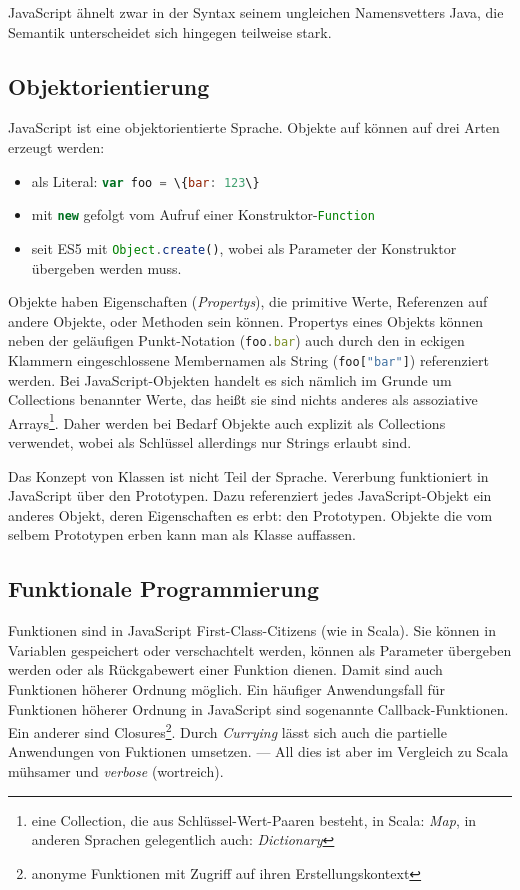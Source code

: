 \documentclass[a4paper, 12pt, hidelinks, listof=totoc, listoftables=totoc, bibliography=totoc]{scrreprt}
\newcommand{\code}[1]{\lstinline[language=Scala, style=inline]|#1|}
\newcommand{\js}[1]{\lstinline[language=JavaScript, style=inline]|#1|}
\begin{document}
JavaScript ähnelt zwar in der Syntax seinem ungleichen Namensvetters Java, die Semantik unterscheidet sich hingegen teilweise stark\cite{eich1996.JSL}.


\subsection{Objektorientierung}\label{subsec:js-oo}

JavaScript ist eine objektorientierte Sprache. Objekte auf können auf drei Arten erzeugt werden:

\begin{itemize}
  \item als Literal: \js{var foo = \{bar: 123\}}
  \item mit \js{new} gefolgt vom Aufruf einer Konstruktor-\code{Function}
  \item seit ES5 mit \js{Object.create()}, wobei als Parameter der Konstruktor übergeben werden muss.
\end{itemize}

Objekte haben Eigenschaften (\emph{Propertys}), die primitive Werte, Referenzen auf andere Objekte, oder Methoden sein können. Propertys eines Objekts können neben der geläufigen Punkt-Notation (\js{foo.bar}) auch durch den in eckigen Klammern eingeschlossene Membernamen als String \mbox{(\js{foo["bar"]})} referenziert werden. Bei JavaScript-Objekten handelt es sich nämlich im Grunde um Collections benannter Werte, das heißt sie sind nichts anderes als assoziative Arrays\footnote{eine Collection, die aus Schlüssel-Wert-Paaren besteht, in Scala: \emph{Map}, in anderen Sprachen gelegentlich auch: \emph{Dictionary}}. Daher werden bei Bedarf Objekte auch explizit als Collections verwendet, wobei als Schlüssel allerdings nur Strings erlaubt sind.

Das Konzept von Klassen ist nicht Teil der Sprache. Vererbung funktioniert in JavaScript über den Prototypen. Dazu referenziert jedes JavaScript-Objekt ein anderes Objekt, deren Eigenschaften es erbt: den Prototypen. Objekte die vom selbem Prototypen erben kann man als Klasse auffassen.\cite{mdn.WWO}\cite[S. 115 ff., S. 199 ff.]{flanagan2011.JDG}

\subsection{Funktionale Programmierung}

Funktionen sind in JavaScript First-Class-Citizens (wie in Scala). Sie können in Variablen gespeichert oder verschachtelt werden, können als Parameter übergeben werden oder als Rückgabewert einer Funktion dienen. Damit sind auch Funktionen höherer Ordnung möglich. Ein häufiger Anwendungsfall für Funktionen höherer Ordnung in JavaScript sind sogenannte Callback-Funktionen. Ein anderer sind Closures\footnote{anonyme Funktionen mit Zugriff auf ihren Erstellungskontext}. Durch \emph{Currying} lässt sich auch die partielle Anwendungen von Fuktionen umsetzen. --- All dies ist aber im Vergleich zu Scala mühsamer und \emph{verbose} (wortreich).
\end{document}
